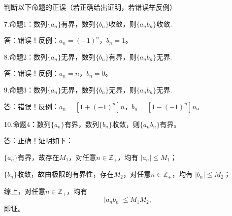 \bs
判断以下命题的正误（若正确给出证明，若错误举反例）

7.命题1：数列$\{a_n\}$有界，数列$\{b_n\}$收敛，则$\{a_nb_n\}$收敛.

答：错误！反例：$a_n=(-1)^n$，$b_n=1$。\fin

\bs
8.命题2：数列$\{a_n\}$无界，数列$\{b_n\}$有界，则$\{a_nb_n\}$无界.

答：错误！反例：$a_n=n$，$b_n=0$。\fin

\bs
9.命题3：数列$\{a_n\}$无界，数列$\{b_n\}$无界，则$\{a_nb_n\}$无界.

答：错误！反例：$a_n=[1+(-1)^n]n$，$b_n=[1-(-1)^n]n$。\fin

\bs
10.命题4：数列$\{a_n\}$有界，数列$\{b_n\}$收敛，则$\{a_nb_n\}$有界。

答：正确！证明如下：

$\{a_n\}$有界，故存在$M_1$，对任意$n\in\mathbb{Z}_+$，均有
$|a_n|\leq M_1$；

$\{b_n\}$收敛，故由极限的有界性，存在$M_2$，对任意$n\in\mathbb{Z}_+$，均有
$|b_n|\leq M_2$；

综上，对任意$n\in\mathbb{Z}_+$，均有
$$|a_nb_n|\leq M_1M_2,$$
即证。\fin